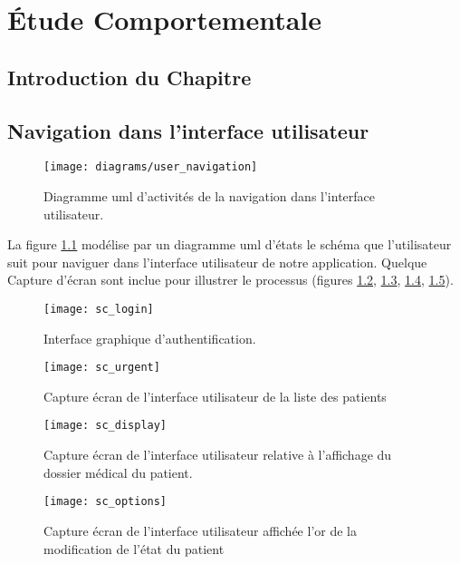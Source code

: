 \chapter{Étude Comportementale}

\section{Introduction du Chapitre}

\section{Navigation dans l'interface utilisateur}

\begin{figure}
\center
\texttt{[image: diagrams/user\_navigation]}
\caption{Diagramme \gls{uml} d'activités de la navigation dans l'interface utilisateur.}
\label{fig:uml_act_ui}
\end{figure}

La figure \ref{fig:uml_act_ui} modélise par un diagramme \gls{uml} d'états le schéma que l'utilisateur suit pour naviguer dans l'interface utilisateur de notre application. Quelque Capture d'écran sont inclue pour illustrer le processus (figures \ref{fig:sc_login}, \ref{fig:sc_urgent}, \ref{fig:sc_display}, \ref{fig:sc_options}).

\begin{figure}
\center
\texttt{[image: sc\_login]}
\caption{Interface graphique d'authentification.}
\label{fig:sc_login}
\end{figure}

\begin{figure}
\center
\texttt{[image: sc\_urgent]}
\caption{Capture écran de l'interface utilisateur de la liste des patients}
\label{fig:sc_urgent}
\end{figure}

\begin{figure}
\center
\texttt{[image: sc\_display]}
\caption{Capture écran de l'interface utilisateur relative à l'affichage du dossier médical du patient.}
\label{fig:sc_display}
\end{figure}

\begin{figure}
\center
\texttt{[image: sc\_options]}
\caption{Capture écran de l'interface utilisateur affichée l'or de la modification de l’état du patient}
\label{fig:sc_options}
\end{figure}

